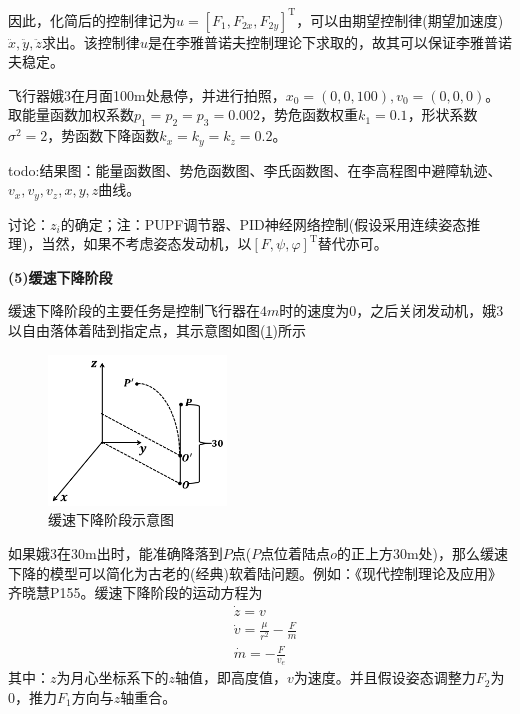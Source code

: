             因此，化简后的控制律记为$u=[F_1,F_{2x},F_{2y}]^\mathrm{T}$，可以由期望控制律(期望加速度)$\ddot{x},\ddot{y},\ddot{z}$求出。该控制律$u$是在李雅普诺夫控制理论下求取的，故其可以保证李雅普诺夫稳定。
            \par
            飞行器娥3在月面100m处悬停，并进行拍照，$x_0 = (0,0,100),v_0=(0,0,0)$。取能量函数加权系数$p_1=p_2=p_3=0.002$，势危函数权重$k_1=0.1$，形状系数$\sigma^2=2$，势函数下降函数$k_x=k_y=k_z= 0.2$。
            \par
            todo:结果图：能量函数图、势危函数图、李氏函数图、在李高程图中避障轨迹、$v_x,v_y,v_z,x,y,z$曲线。
            \par
            讨论：$z_i$的确定；注：PUPF调节器、PID神经网络控制(假设采用连续姿态推理)，当然，如果不考虑姿态发动机，以$[F,\psi,\varphi]^\mathrm{T}$替代亦可。
            \par
            \textbf{(5)缓速下降阶段}
            \par
            缓速下降阶段的主要任务是控制飞行器在$4m$时的速度为0，之后关闭发动机，娥3以自由落体着陆到指定点，其示意图如图(\ref{fig:缓速下降阶段示意图})所示
            \begin{figure}[H]
            \centering
            \includegraphics[height=4cm]{images/slow_down.jpg}
            \caption{缓速下降阶段示意图}
            \label{fig:缓速下降阶段示意图}
            \end{figure}
            \par
            如果娥3在30m出时，能准确降落到$P$点($P$点位着陆点$o$的正上方30m处)，那么缓速下降的模型可以简化为古老的(经典)软着陆问题。例如：《现代控制理论及应用》齐晓慧P155。缓速下降阶段的运动方程为
            \begin{align*}
            & \dot{z} = v\\
            & \dot{v} = \frac{\mu}{r^2} - \frac{F}{m}\\
            & \dot{m} = -\frac{F}{v_e}
            \end{align*}
            其中：$z$为月心坐标系下的$z$轴值，即高度值，$v$为速度。并且假设姿态调整力$F_2$为0，推力$F_1$方向与$z$轴重合。
            \par
